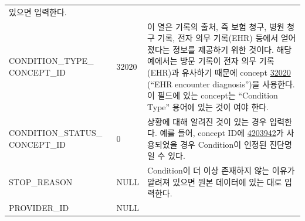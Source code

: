 \documentclass[11pt]{book}
\theoremstyle{definition}
\theoremstyle{definition}
\theoremstyle{definition}
\theoremstyle{remark}
\begin{document}
\begin{longtable}[]{@{}lll@{}}
\begin{minipage}[t]{0.48\columnwidth}
있으면 입력한다.\strut
\end{minipage}\tabularnewline
\begin{minipage}[t]{0.28\columnwidth}\raggedright\strut
CONDITION\_TYPE\_ CONCEPT\_ID\strut
\end{minipage} & \begin{minipage}[t]{0.16\columnwidth}\raggedright\strut
32020\strut
\end{minipage} & \begin{minipage}[t]{0.48\columnwidth}\raggedright\strut
이 열은 기록의 출처, 즉 보험 청구, 병원 청구 기록, 전자 의무 기록(EHR)
등에서 얻어졌다는 정보를 제공하기 위한 것이다. 해당 예에서는 방문 기록이
전자 의무 기록(EHR)과 유사하기 때문에 concept
\href{http://athena.ohdsi.org/search-terms/terms/32020}{32020} (``EHR
encounter diagnosis'')을 사용한다. 이 필드에 있는 concept는 ``Condition
Type'' 용어에 있는 것이 여야 한다.\strut
\end{minipage}\tabularnewline
\begin{minipage}[t]{0.28\columnwidth}\raggedright\strut
CONDITION\_STATUS\_ CONCEPT\_ID\strut
\end{minipage} & \begin{minipage}[t]{0.16\columnwidth}\raggedright\strut
0\strut
\end{minipage} & \begin{minipage}[t]{0.48\columnwidth}\raggedright\strut
상황에 대해 알려진 것이 있는 경우 입력한다. 예를 들어, concept ID에
\href{http://athena.ohdsi.org/search-terms/terms/4203942}{4203942}가
사용되었을 경우 Condition이 인정된 진단명일 수 있다.\strut
\end{minipage}\tabularnewline
\begin{minipage}[t]{0.28\columnwidth}\raggedright\strut
STOP\_REASON\strut
\end{minipage} & \begin{minipage}[t]{0.16\columnwidth}\raggedright\strut
NULL\strut
\end{minipage} & \begin{minipage}[t]{0.48\columnwidth}\raggedright\strut
Condition이 더 이상 존재하지 않는 이유가 알려져 있으면 원본 데이터에
있는 대로 입력한다.\strut
\end{minipage}\tabularnewline
\begin{minipage}[t]{0.28\columnwidth}\raggedright\strut
PROVIDER\_ID\strut
\end{minipage} & \begin{minipage}[t]{0.16\columnwidth}\raggedright\strut
NULL\strut
\end{minipage} & \begin{minipage}[t]{0.48\columnwidth}\raggedright\strut

\end{minipage}
\end{longtable}
\end{document}
